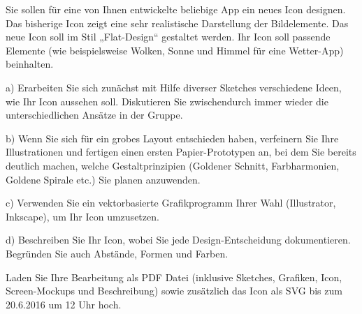 \documentclass[a4paper,10pt]{article}
\begin{document}
\kopf
\renewcommand{\figurename}{Figure}


Sie sollen für eine von Ihnen entwickelte beliebige App ein neues Icon designen. Das bisherige Icon zeigt eine sehr realistische Darstellung der Bildelemente. Das neue Icon soll im Stil „Flat-Design“ gestaltet werden. Ihr Icon soll passende Elemente (wie beispielsweise Wolken, Sonne und Himmel für eine Wetter-App) beinhalten.

a) Erarbeiten Sie sich zunächst mit Hilfe diverser Sketches verschiedene Ideen, wie Ihr Icon aussehen soll. Diskutieren Sie zwischendurch immer wieder die unterschiedlichen Ansätze in der Gruppe.

b) Wenn Sie sich für ein grobes Layout entschieden haben, verfeinern Sie Ihre Illustrationen und fertigen einen ersten Papier-Prototypen an, bei dem Sie bereits deutlich machen, welche Gestaltprinzipien (Goldener Schnitt, Farbharmonien, Goldene Spirale etc.) Sie planen anzuwenden.

c) Verwenden Sie ein vektorbasierte Grafikprogramm Ihrer Wahl (Illustrator, Inkscape), um Ihr Icon umzusetzen.

d) Beschreiben Sie Ihr Icon, wobei Sie jede Design-Entscheidung dokumentieren. Begründen Sie auch Abstände, Formen und Farben.

Laden Sie Ihre Bearbeitung als PDF Datei (inklusive Sketches, Grafiken, Icon, Screen-Mockups und Beschreibung) sowie zusätzlich das Icon als SVG bis zum 20.6.2016 um 12 Uhr hoch.\\
\newpage
 
\end{document}
